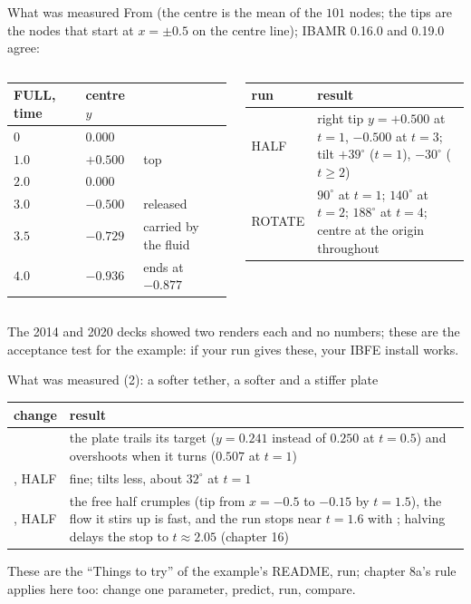 \documentclass[aspectratio=169,11pt]{beamer}
\begin{document}
\begin{frame}{What was measured}
\label{fr:numbers}
\footnotesize
From  (the centre is the mean of the $101$ nodes; the tips are the nodes that start at $x = \pm 0.5$ on the centre line); IBAMR 0.16.0 and 0.19.0 agree:

\begin{columns}[T]
\begin{tabular}{@{}lll@{}}
\toprule
FULL, time & centre $y$ & \\
\midrule
$0$ & $0.000$ & \\
$1.0$ & $+0.500$ & top \\
$2.0$ & $0.000$ & \\
$3.0$ & $-0.500$ & released \\
$3.5$ & $-0.729$ & carried by the fluid \\
$4.0$ & $-0.936$ & ends at $-0.877$ \\
\bottomrule
\end{tabular}
\begin{tabular}{@{}L{0.30\textwidth}L{0.62\textwidth}@{}}
\toprule
run & result \\
\midrule
HALF & right tip $y = +0.500$ at $t = 1$, $-0.500$ at $t = 3$; tilt $+39^\circ$ ($t = 1$), $-30^\circ$ ($t \ge 2$) \\
ROTATE & $90^\circ$ at $t = 1$; $140^\circ$ at $t = 2$; $188^\circ$ at $t = 4$; centre at the origin throughout \\
\bottomrule
\end{tabular}
\end{columns}

\medskip
The 2014 and 2020 decks showed two renders each and no numbers; these are the acceptance test for the example: if your run gives these, your IBFE install works.
\end{frame}

\begin{frame}{What was measured (2): a softer tether, a softer and a stiffer plate}
\label{fr:numbers2}
\footnotesize
\begin{tabular}{@{}L{0.30\textwidth}L{0.62\textwidth}@{}}
\toprule
change & result \\
\midrule
{} & the plate trails its target ($y = 0.241$ instead of $0.250$ at $t = 0.5$) and overshoots when it turns ($0.507$ at $t = 1$) \\
, HALF & fine; tilts less, about $32^\circ$ at $t = 1$ \\
, HALF & the free half crumples (tip from $x = -0.5$ to $-0.15$ by $t = 1.5$), the flow it stirs up is fast, and the run stops near $t = 1.6$ with ; halving  delays the stop to $t \approx 2.05$ (chapter 16) \\
\bottomrule
\end{tabular}

\medskip
These are the ``Things to try'' of the example's README, run; chapter 8a's rule applies here too: change one parameter, predict, run, compare.
\end{frame}
\end{document}
